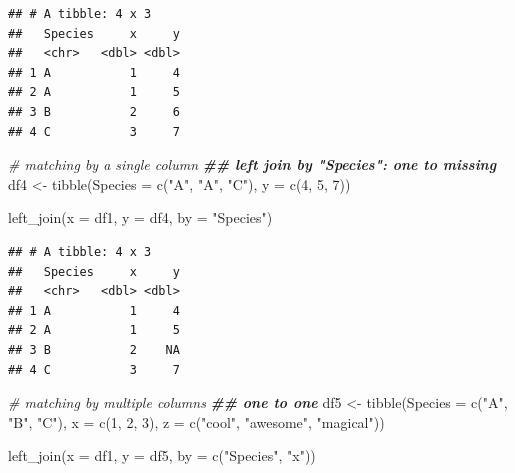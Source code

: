 \documentclass[
]{book}
\newenvironment{Shaded}{\begin{snugshade}}{\end{snugshade}}
\newcommand{\AttributeTok}[1]{\textcolor[rgb]{0.77,0.63,0.00}{#1}}
\newcommand{\CommentTok}[1]{\textcolor[rgb]{0.56,0.35,0.01}{\textit{#1}}}
\newcommand{\DecValTok}[1]{\textcolor[rgb]{0.00,0.00,0.81}{#1}}
\newcommand{\DocumentationTok}[1]{\textcolor[rgb]{0.56,0.35,0.01}{\textbf{\textit{#1}}}}
\newcommand{\FunctionTok}[1]{\textcolor[rgb]{0.00,0.00,0.00}{#1}}
\newcommand{\NormalTok}[1]{#1}
\newcommand{\OtherTok}[1]{\textcolor[rgb]{0.56,0.35,0.01}{#1}}
\newcommand{\StringTok}[1]{\textcolor[rgb]{0.31,0.60,0.02}{#1}}
\begin{document}
\begin{verbatim}
## # A tibble: 4 x 3
##   Species     x     y
##   <chr>   <dbl> <dbl>
## 1 A           1     4
## 2 A           1     5
## 3 B           2     6
## 4 C           3     7
\end{verbatim}

\begin{Shaded}
\begin{Highlighting}[]
\CommentTok{\# matching by a single column}
\DocumentationTok{\#\# left join by "Species": one to missing}
\NormalTok{df4 }\OtherTok{\textless{}{-}} \FunctionTok{tibble}\NormalTok{(}\AttributeTok{Species =} \FunctionTok{c}\NormalTok{(}\StringTok{"A"}\NormalTok{, }\StringTok{"A"}\NormalTok{, }\StringTok{"C"}\NormalTok{),}
              \AttributeTok{y =} \FunctionTok{c}\NormalTok{(}\DecValTok{4}\NormalTok{, }\DecValTok{5}\NormalTok{, }\DecValTok{7}\NormalTok{))}

\FunctionTok{left\_join}\NormalTok{(}\AttributeTok{x =}\NormalTok{ df1,}
          \AttributeTok{y =}\NormalTok{ df4,}
          \AttributeTok{by =} \StringTok{"Species"}\NormalTok{)}
\end{Highlighting}
\end{Shaded}

\begin{verbatim}
## # A tibble: 4 x 3
##   Species     x     y
##   <chr>   <dbl> <dbl>
## 1 A           1     4
## 2 A           1     5
## 3 B           2    NA
## 4 C           3     7
\end{verbatim}

\begin{Shaded}
\begin{Highlighting}[]
\CommentTok{\# matching by multiple columns}
\DocumentationTok{\#\# one to one}
\NormalTok{df5 }\OtherTok{\textless{}{-}} \FunctionTok{tibble}\NormalTok{(}\AttributeTok{Species =} \FunctionTok{c}\NormalTok{(}\StringTok{"A"}\NormalTok{, }\StringTok{"B"}\NormalTok{, }\StringTok{"C"}\NormalTok{),}
              \AttributeTok{x =} \FunctionTok{c}\NormalTok{(}\DecValTok{1}\NormalTok{, }\DecValTok{2}\NormalTok{, }\DecValTok{3}\NormalTok{),}
              \AttributeTok{z =} \FunctionTok{c}\NormalTok{(}\StringTok{"cool"}\NormalTok{, }\StringTok{"awesome"}\NormalTok{, }\StringTok{"magical"}\NormalTok{))}

\FunctionTok{left\_join}\NormalTok{(}\AttributeTok{x =}\NormalTok{ df1,}
          \AttributeTok{y =}\NormalTok{ df5,}
          \AttributeTok{by =} \FunctionTok{c}\NormalTok{(}\StringTok{"Species"}\NormalTok{, }\StringTok{"x"}\NormalTok{))}
\end{Highlighting}
\end{Shaded}
\end{document}
